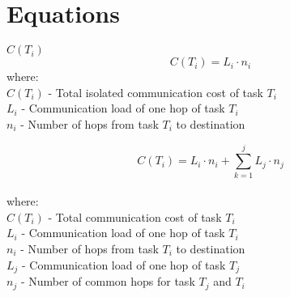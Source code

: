 \chapter{Equations}

$C(T_i)$
\[
C(T_i) = L_i \cdot n_i
\]
where:
\\$C(T_i)$ - Total isolated communication cost of task $T_i$ 
\\$L_i$ - Communication load of one hop of task $T_i$
\\$n_i$ - Number of hops from task $T_i$ to destination

\[
C(T_i) = L_i \cdot n_i + \sum_{k=1}^{j} L_j \cdot n_j
\]
\\where:
\\$C(T_i)$ - Total communication cost of task $T_i$ 
\\$L_i$ - Communication load of one hop of task $T_i$
\\$n_i$ - Number of hops from task $T_i$ to destination
\\$L_j$ - Communication load of one hop of task $T_j$
\\$n_j$ - Number of common hops for task $T_j$ and $T_i$
